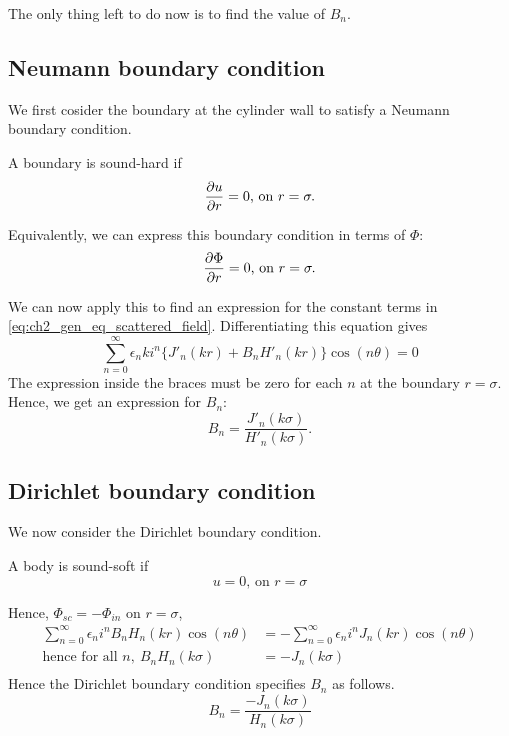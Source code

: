 The only thing left to do now is to find the value of $B_n$.

\subsection*{Neumann boundary condition}

We first cosider the boundary at the cylinder wall to satisfy a Neumann boundary condition.
  \begin{defn}
    \parencite[$\S$1.3.2]{martin06scattering} A boundary is sound-hard if
      \begin{align*}
        \frac{\partial u}{\partial r} = 0 \text{,  on } r = \sigma.
      \end{align*}
  \end{defn} \par
%
Equivalently, we can express this boundary condition in terms of $\Phi$:
  \begin{align*}
    \frac{\partial \Phi}{\partial r}=0 \text{,  on } r = \sigma.
  \end{align*} \par
%
We can now apply this to find an expression for the constant terms in \eqref{eq:ch2_gen_eq_scattered_field}. Differentiating this equation gives
  \begin{equation}
    \sum^\infty_{n=0} \epsilon_n k i^n
    \{ J'_n(kr) + B_n H'_n(kr) \} \cos(n\theta) = 0
  \end{equation}
The expression inside the braces must be zero for each $n$ at the boundary $r=\sigma$. Hence, we get an expression for $B_n$:
  \begin{equation}
    B_n= \frac{J'_n(k\sigma)}{H'_n(k\sigma)}.
  \end{equation}

\subsection*{Dirichlet boundary condition}\label{ss:ch2_dirichlet_bcs}
We now consider the Dirichlet boundary condition.
  \begin{defn}
    \parencite[$\S$1.3.2]{martin06scattering} A body is sound-soft if
      \[
      u = 0 \text{,  on } r = \sigma
      \]
  \end{defn}
Hence, $\Phi_{sc} = - \Phi_{in}$ on $r=\sigma$,
  \begin{align*}
    \sum^\infty_{n=0} \epsilon_n i^n B_n H_n(kr) \cos(n\theta)
    & = - \sum^\infty_{n=0} \epsilon_n i^n J_n(kr) \cos(n\theta) \\
    \text{hence for all } n,~ B_n H_n (k\sigma) &= - J_n (k\sigma) \\
  \end{align*}
Hence the Dirichlet boundary condition specifies $B_n$ as follows.
  \begin{equation}
    B_n = \frac{- J_n(k\sigma)}{H_n(k\sigma)}
  \end{equation}
